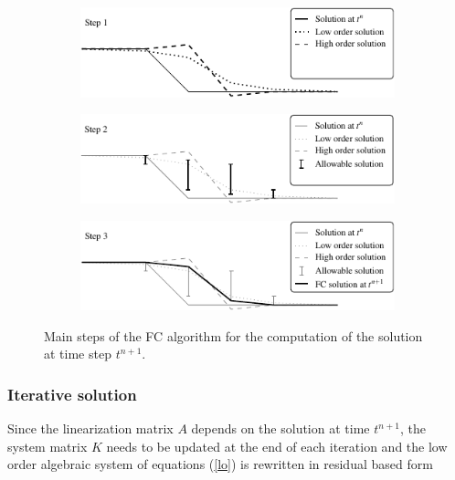 \begin{figure}
\centering
\begin{subfigure}{.8\textwidth}
    \includegraphics[width=\textwidth]{img/eulerian/fc/fc_step_1.pdf}
    \vspace{1em}
\end{subfigure}
\begin{subfigure}{.8\textwidth}
    \includegraphics[width=\textwidth]{img/eulerian/fc/fc_step_2.pdf}
    \vspace{1em}
\end{subfigure}
\begin{subfigure}{.8\textwidth}
    \includegraphics[width=\textwidth]{img/eulerian/fc/fc_step_3.pdf}
\end{subfigure}
\caption{Main steps of the FC algorithm for the computation of the solution at time step $t^{n+1}$.}
\label{sw_fc_steps}
\end{figure}



\subsubsection{Iterative solution}

Since the linearization matrix $A$ depends on the solution at time $t^{n+1}$, the system matrix $K$ needs to be updated at the end of each iteration and the low order algebraic system of equations (\ref{lo}) is rewritten in residual based form

